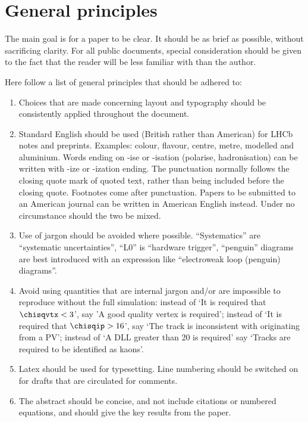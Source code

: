 \section{General principles}

The main goal is for a paper to be clear. It should be as brief as
possible, without sacrificing clarity. For all public documents,
special consideration should be given to the fact that the reader will
be less familiar with \lhcb than the author.

Here follow a list of general principles that should be adhered to:
\begin{enumerate}

\item Choices that are made concerning layout and typography
  should be consistently applied throughout the document.

\item Standard English should be used (British rather than American)
  for LHCb notes and preprints. Examples: colour, flavour, centre,
  metre, modelled and aluminium. Words ending on -ise or -isation
  (polarise, hadronisation) can be written with -ize or -ization ending.
  The punctuation normally follows the closing
  quote mark of quoted text, rather than being included before the
  closing quote.
  Footnotes come after punctuation. 
  Papers to be submitted to an American journal can be written in American
  English instead. Under no circumstance should the two be mixed.

\item Use of jargon should be avoided where possible. ``Systematics'' are ``systematic
  uncertainties'', ``L0'' is ``hardware trigger'', ``penguin'' diagrams
  are best introduced with an expression like ``electroweak loop (penguin) diagrams''.

\item Avoid using quantities that are internal jargon and/or are impossible to reproduce without the full simulation:
instead of `It is required that $\chisqvtx<3$', say 'A good quality vertex is required';
instead of `It is required that $\chisqip>16$', say `The track is inconsistent with originating from a PV';
instead of `A DLL greater than 20 is required' say `Tracks are required to be identified as kaons'.


\item Latex should be used for typesetting. Line numbering should be
  switched on for drafts that are circulated for comments.

\item The abstract should be concise, and not include citations or
  numbered equations, and should give the key results from the paper.


\end{enumerate}
